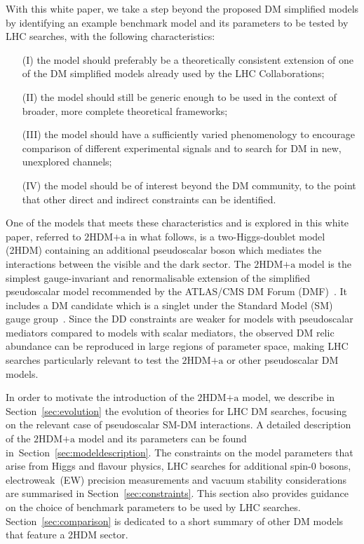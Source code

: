 \documentclass[a4paper, 11pt,notoc]{article}
\newcommand{\hdma}{\ensuremath{\textrm{2HDM+a}}\xspace}
\begin{document}
With this white paper, we take a step beyond the proposed DM simplified models by identifying an example benchmark model and its parameters to be tested by LHC searches, with the following characteristics: 
\begin{itemize}
\item[(I)] the model should preferably be a theoretically consistent extension of one of the DM simplified models already used by the LHC Collaborations;
\item[(II)] the model should still be generic enough to be used in the context of broader, more complete theoretical frameworks;  
\item[(III)] the model should have a sufficiently varied phenomenology to encourage comparison of different experimental signals and to search for DM in new, unexplored channels;
\item[(IV)] the model should be of interest beyond the DM community, to the point that other direct and indirect constraints can be identified.
\end{itemize}

One of the models that meets these characteristics and is explored in this white paper,  referred to \hdma in what follows,  is a two-Higgs-doublet model (2HDM) containing an additional pseudoscalar boson which mediates the interactions between the visible and the dark sector.  The \hdma model is the simplest gauge-invariant and renormalisable extension of the  simplified pseudoscalar model recommended by the ATLAS/CMS DM Forum (DMF)~\cite{Abercrombie:2015wmb}. It includes a  DM candidate which is a singlet under the Standard Model (SM) gauge group~\cite{Ipek:2014gua,No:2015xqa,Goncalves:2016iyg,Bauer:2017ota,Tunney:2017yfp}.  Since the DD constraints are weaker for models with pseudoscalar mediators compared to models with scalar mediators, the observed DM relic abundance can be reproduced in large regions of parameter space, making LHC searches particularly relevant to test the \hdma or other pseudoscalar DM models.

In order to motivate the introduction of the \hdma model, we describe in Section~\ref{sec:evolution} the evolution of theories for LHC DM searches, focusing on the relevant case of pseudoscalar SM-DM interactions. A detailed description of the \hdma model and its parameters can be found in~Section~\ref{sec:modeldescription}. The constraints on the model parameters that arise from Higgs and flavour physics, LHC searches for additional spin-0 bosons, electroweak~(EW) precision measurements and vacuum stability considerations are summarised in Section~\ref{sec:constraints}. This section also provides guidance on the choice of benchmark parameters to be used by LHC searches. Section~\ref{sec:comparison} is dedicated to a short summary of other DM models that feature a 2HDM sector. 
\end{document}
